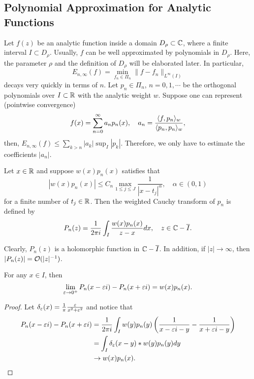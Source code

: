 \subsection{Polynomial Approximation for Analytic Functions}
Let $f(z)$ be an analytic function inside a domain
$D_{\rho}\subset \mathbb C$, where a finite interval $I\subset D_{\rho}$. Usually, $f$ can be well approximated by polynomials in $D_{\rho}$. Here, the parameter $\rho$ and the definition of $D_{\rho}$ will be elaborated later. In particular,   
\begin{equation}
    E_{n,\infty}(f) = \min_{f_n\in \Pi_n} \|f - f_n\|_{L^{\infty}(I)}
\end{equation}
decays very quickly in terms of $n$. Let $p_n\in \Pi_n$, $n = 0,1,\cdots$ be the orthogonal polynomials over $I\subset \mathbb R$ with the analytic weight $w$.  Suppose one can represent (pointwise convergence)
\begin{equation}
    f(x) = \sum_{n=0}^{\infty} a_n p_n(x), \quad a_n = \frac{\langle {f, p_n} \rangle_w}{\langle {p_n, p_n} \rangle_w}, 
\end{equation}
then, $E_{n, \infty}(f) \le  \sum_{k > n} | a_k | \sup_{I} \left| p_k \right|$. Therefore, we only have to estimate the coefficients $|a_n|$. 
\begin{definition}
\label{Def: 4-Wei-Cau-Tra}
Let $x\in \mathbb R$ and suppose $w(x) p_n(x)$ satisfies that 
\begin{equation}
    |w(x) p_n(x)| \le C_n \max_{1\le j\le J} \frac{1}{|x - t_j|^{\alpha}}, \quad \alpha \in (0, 1)
\end{equation}
for a finite number of $t_j\in \mathbb R$. Then the weighted Cauchy transform of $p_n$ is defined by 
\begin{equation}
    P_n(z) = \frac{1}{2\pi i} \int_{I} \frac{w(x) p_n(x)}{z - x} dx,\quad z \in \mathbb C - \overline{I}. 
\end{equation}
\end{definition}
Clearly, $P_n(z)$ is a holomorphic function in $\mathbb C - \overline{I}$. In addition, if $|z|\to \infty$, then $|P_n(z)| = \mathcal O(|z|^{-1})$. 
\begin{lemma}
\label{Lem: 4-PLE-For}
    For any $x\in I$, then 
    $$\lim_{\varepsilon\to 0^{+}}P_n(x - \varepsilon i) - P_n(x + \varepsilon i) = w(x) p_n(x). $$ 
\end{lemma}
\begin{proof}
    Let $\delta_{\varepsilon}(x) =  \frac{1}{\pi} \frac{\varepsilon}{x^2 + \varepsilon^2}$ and notice that 
    \begin{equation}
    \begin{aligned}
           P_n(x - \varepsilon i) - P_n(x + \varepsilon i) &= \frac{1}{2\pi i } \int_I w(y)p_n(y) \left(\frac{1}{x - \varepsilon i - y}  - \frac{1}{x + \varepsilon i - y} \right) \\ 
           &= \int_I \delta_{\varepsilon}(x-y) \ast  w(y) p_n(y)  dy \\
           &\to  w(x) p_n(x).
    \end{aligned}
    \end{equation}
\end{proof}
